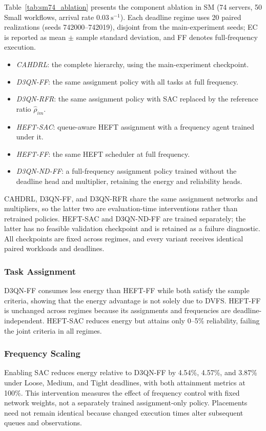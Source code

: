 \documentclass[journal]{IEEEtran}
\begin{document}
Table~\ref{tab:sm74_ablation} presents the component ablation in SM (74 servers, 50 Small workflows, arrival rate $0.03~\mathrm{s}^{-1}$). Each deadline regime uses 20 paired realizations (seeds 742000--742019), disjoint from the main-experiment seeds; EC is reported as mean $\pm$ sample standard deviation, and FF denotes full-frequency execution.
\begin{itemize}
\item \emph{CAHDRL}: the complete hierarchy, using the main-experiment checkpoint.
\item \emph{D3QN-FF}: the same assignment policy with all tasks at full frequency.
\item \emph{D3QN-RFR}: the same assignment policy with SAC replaced by the reference ratio $\widehat\rho_{im}$.
\item \emph{HEFT-SAC}: queue-aware HEFT assignment with a frequency agent trained under it.
\item \emph{HEFT-FF}: the same HEFT scheduler at full frequency.
\item \emph{D3QN-ND-FF}: a full-frequency assignment policy trained without the deadline head and multiplier, retaining the energy and reliability heads.
\end{itemize}
CAHDRL, D3QN-FF, and D3QN-RFR share the same assignment networks and multipliers, so the latter two are evaluation-time interventions rather than retrained policies. HEFT-SAC and D3QN-ND-FF are trained separately; the latter has no feasible validation checkpoint and is retained as a failure diagnostic. All checkpoints are fixed across regimes, and every variant receives identical paired workloads and deadlines.

\subsubsection{Task Assignment}
D3QN-FF consumes less energy than HEFT-FF while both satisfy the sample criteria, showing that the energy advantage is not solely due to DVFS. HEFT-FF is unchanged across regimes because its assignments and frequencies are deadline-independent. HEFT-SAC reduces energy but attains only 0--5\% reliability, failing the joint criteria in all regimes.
\subsubsection{Frequency Scaling}
Enabling SAC reduces energy relative to D3QN-FF by 4.54\%, 4.57\%, and 3.87\% under Loose, Medium, and Tight deadlines, with both attainment metrics at 100\%. This intervention measures the effect of frequency control with fixed network weights, not a separately trained assignment-only policy. Placements need not remain identical because changed execution times alter subsequent queues and observations.
\end{document}
